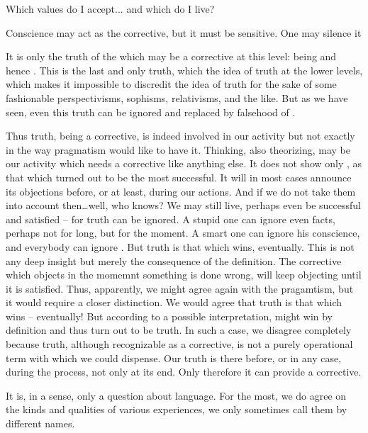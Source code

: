 Which values do I accept... and which do I live? 

Conscience may act as the corrective, but it must be sensitive. One may silence it

\inv It is only the truth of the  which may be a corrective at this
level: being  and hence . This is the last and only  truth, which  the
idea of truth at the lower levels, which makes it impossible to discredit the
idea of truth for the sake of some fashionable perspectivisms, sophisms,
relativisms, and the like. But as we have seen, even this truth can be ignored
and replaced by falsehood of \No. 

\pa
Thus truth, being a corrective, is indeed involved in our activity but not exactly in
the way pragmatism would like to have it. Thinking, also theorizing, may be our
activity which needs a corrective like anything else. It does not show only
, as that which turned out to be the most successful. It will in
most cases announce its objections before, or at least, during our actions. And if
we do not take them into account then\ldots well, who knows? We may still live,
perhaps even be successful and satisfied -- for truth can be ignored. A stupid
one can ignore even facts, perhaps not for long, but for the moment. A smart one
can ignore his conscience, and everybody can ignore . But
truth is that which wins, eventually. This is not any deep insight but merely
the consequence of the definition. The corrective which objects in the momemnt
something is done wrong, will keep objecting until it is satisfied. Thus,
apparently, we might agree again with the pragamtism, but it would require a
closer distinction. We would agree that truth is that which wins -- eventually!
But according to a possible interpretation,  might win by
definition and thus turn out to be truth. In such a case, we disagree completely
because truth, although recognizable as a corrective, is not a purely
operational term with which we could dispense. Our truth is there before, or in
any case, during the process, not only at its end. Only therefore it can provide
a corrective. 



\pa
It is, in a sense, only a question about language. 
For the most, we do agree on the kinds and qualities of various 
experiences, we only sometimes call them by different names.

